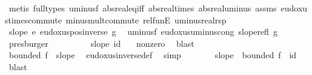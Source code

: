 \begin{isabellebody}
\ {\isacharparenleft}{\kern0pt}metis\ {\isacharparenleft}{\kern0pt}full{\isacharunderscore}{\kern0pt}types{\isacharparenright}{\kern0pt}\ uminus{\isacharunderscore}{\kern0pt}f{\isacharparenleft}{\kern0pt}{}{\isacharparenright}{\kern0pt}\ abs{\isacharunderscore}{\kern0pt}real{\isacharunderscore}{\kern0pt}eq{\isacharunderscore}{\kern0pt}iff\ abs{\isacharunderscore}{\kern0pt}real{\isacharunderscore}{\kern0pt}times\ abs{\isacharunderscore}{\kern0pt}real{\isacharunderscore}{\kern0pt}uminus\ assms{\isacharparenleft}{\kern0pt}{}{\isacharparenright}{\kern0pt}\ eudoxus{\isacharunderscore}{\kern0pt}times{\isacharunderscore}{\kern0pt}commute\ minus{\isacharunderscore}{\kern0pt}mult{\isacharunderscore}{\kern0pt}commute\ rel{\isacharunderscore}{\kern0pt}funE\ uminus{\isacharunderscore}{\kern0pt}real{\isachardot}{\kern0pt}rsp{\isacharparenright}{\kern0pt}\isanewline
\ \ \ \ \ \ \isamarkupfalse%
\ \isamarkupfalse%
\ {\isachardoublequoteopen}slope\ {\isacharparenleft}{\kern0pt}{\isacharminus}{\kern0pt}\isactrlsub e\ {\isacharparenleft}{\kern0pt}eudoxus{\isacharunderscore}{\kern0pt}pos{\isacharunderscore}{\kern0pt}inverse\ g{\isacharparenright}{\kern0pt}{\isacharparenright}{\kern0pt}{\isachardoublequoteclose}\ \isamarkupfalse%
\ uminus{\isacharunderscore}{\kern0pt}f\ eudoxus{\isacharunderscore}{\kern0pt}uminus{\isacharunderscore}{\kern0pt}cong\ slope{\isacharunderscore}{\kern0pt}refl\ g\ \isamarkupfalse%
\ presburger\isanewline
\ \ \ \ \ \ \isamarkupfalse%
\ \isamarkupfalse%
\ {\isacharquery}{\kern0pt}slope\ {\isacharquery}{\kern0pt}id\ \isamarkupfalse%
\ {\isacharasterisk}{\kern0pt}\ nonzero\ \isamarkupfalse%
\ blast{\isacharplus}{\kern0pt}\isanewline
\ \ \ \ \isacommand{{\isacharbraceright}{\kern0pt}}\isamarkupfalse%
\isanewline
\ \ \ \ \isamarkupfalse%
\ \isamarkupfalse%
\ {\isachardoublequoteopen}bounded\ f\ {\isasymLongrightarrow}\ {\isacharquery}{\kern0pt}slope{\isachardoublequoteclose}\ \isamarkupfalse%
\ eudoxus{\isacharunderscore}{\kern0pt}inverse{\isacharunderscore}{\kern0pt}def\ \isamarkupfalse%
\ simp\isanewline
\ \ \ \ \isamarkupfalse%
\ \isamarkupfalse%
\ {\isacharquery}{\kern0pt}slope\ {\isachardoublequoteopen}{\isasymnot}\ bounded\ f\ {\isasymLongrightarrow}\ {\isacharquery}{\kern0pt}id{\isachardoublequoteclose}\ \isamarkupfalse%
\ blast{\isacharplus}{\kern0pt}\isanewline

\end{isabellebody}
